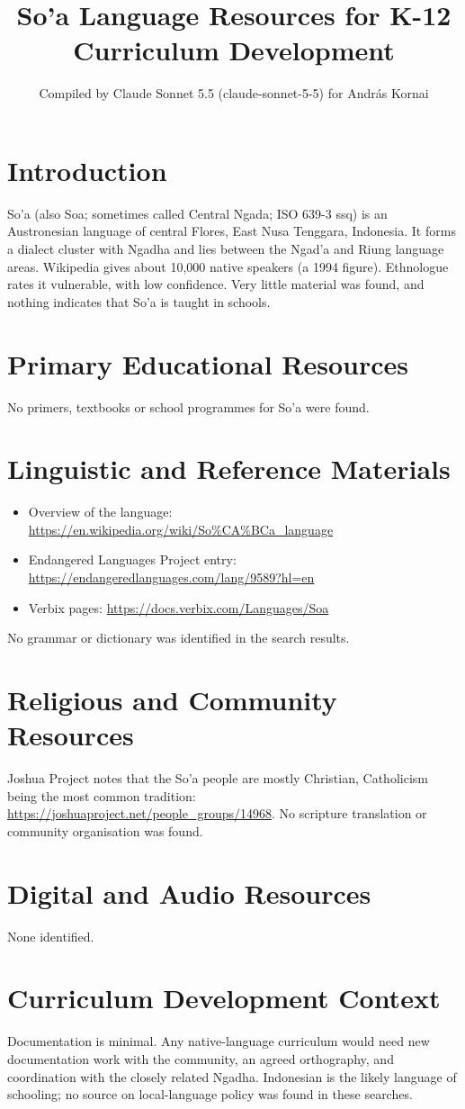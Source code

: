 \documentclass[12pt]{article}
\title{So'a Language Resources for K-12 Curriculum Development}
\author{Compiled by Claude Sonnet 5.5 (claude-sonnet-5-5) for Andr\'as Kornai}
\date{}
\begin{document}
\maketitle

\section{Introduction}
So'a (also Soa; sometimes called Central Ngada; ISO 639-3 ssq) is an Austronesian language of central Flores, East Nusa Tenggara, Indonesia. It forms a dialect cluster with Ngadha and lies between the Ngad'a and Riung language areas. Wikipedia gives about 10,000 native speakers (a 1994 figure). Ethnologue rates it vulnerable, with low confidence. Very little material was found, and nothing indicates that So'a is taught in schools.

\section{Primary Educational Resources}
No primers, textbooks or school programmes for So'a were found.

\section{Linguistic and Reference Materials}
\begin{itemize}
\item Overview of the language: \url{https://en.wikipedia.org/wiki/So%CA%BCa_language}
\item Endangered Languages Project entry: \url{https://endangeredlanguages.com/lang/9589?hl=en}
\item Verbix pages: \url{https://docs.verbix.com/Languages/Soa}
\end{itemize}
No grammar or dictionary was identified in the search results.

\section{Religious and Community Resources}
Joshua Project notes that the So'a people are mostly Christian, Catholicism being the most common tradition: \url{https://joshuaproject.net/people_groups/14968}. No scripture translation or community organisation was found.

\section{Digital and Audio Resources}
None identified.

\section{Curriculum Development Context}
Documentation is minimal. Any native-language curriculum would need new documentation work with the community, an agreed orthography, and coordination with the closely related Ngadha. Indonesian is the likely language of schooling; no source on local-language policy was found in these searches.
\end{document}
